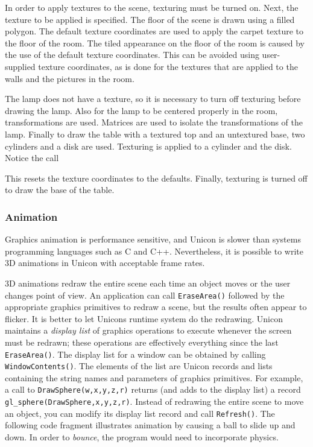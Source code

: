In order to apply textures to the scene, texturing must be turned
on. Next, the texture to be applied is specified. The floor of the
scene is drawn using a filled polygon. The default texture coordinates
are used to apply the carpet texture to the floor of the room. The
tiled appearance on the floor of the room is caused by the use of the
default texture coordinates. This can be avoided using user-supplied
texture coordinates, as is done for the textures that
are applied to the walls and the pictures in the room. 

The lamp does not have a texture, so it is necessary
to turn off texturing before drawing the lamp. Also for the lamp to be
centered properly in the room, transformations are used. Matrices are
used to isolate the transformations of the lamp. Finally to draw
the table with a textured top and an untextured base, two cylinders and
a disk are used. Texturing is applied to a cylinder and the disk.
Notice the call 


\noindent
This resets the texture coordinates to the defaults. Finally, texturing
is turned off to draw the base of the table.

\subsubsection{Animation}

Graphics animation is performance sensitive, and Unicon is slower than
systems programming languages such as C and C++. Nevertheless, it is
possible to write 3D animations in Unicon with acceptable frame rates.

3D animations redraw the entire scene each time an object moves or
the user changes point of view. An application can call \texttt{EraseArea()}
followed by the appropriate graphics primitives to redraw a scene, but
the results often appear to flicker. It is better to let
Unicon{\textquotesingle}s runtime system do the redrawing. Unicon
maintains a \textit{display list} of graphics operations to execute
whenever the screen must be redrawn; these operations are effectively
everything since the last \texttt{EraseArea()}. The display list for a window
can be obtained by calling \texttt{WindowContents()}. The elements of the list
are Unicon records and lists containing the string names and parameters
of graphics primitives. For example, a call to \texttt{DrawSphere(w,x,y,z,r)}
returns (and adds to the display list) a record
\texttt{gl\_sphere({\textquotedbl}DrawSphere{\textquotedbl},x,y,z,r)}. Instead
of redrawing the entire scene to move an object, you can
modify its display list record and call \texttt{Refresh()}. The following code
fragment illustrates animation by causing a ball to slide up and down.
In order to \textit{bounce}, the program would need to incorporate
physics. 

